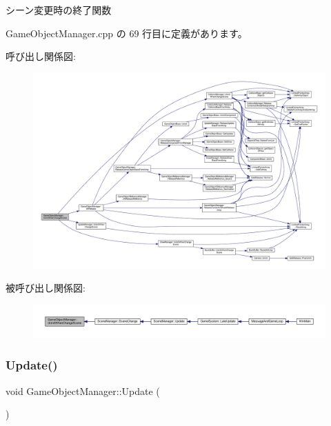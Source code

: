 シーン変更時の終了関数 



 Game\+Object\+Manager.\+cpp の 69 行目に定義があります。

呼び出し関係図\+:
\nopagebreak
\begin{figure}[H]
\begin{center}
\leavevmode
\includegraphics[width=350pt]{class_game_object_manager_ad962739b2c2f54d4160c3513132930da_cgraph}
\end{center}
\end{figure}
被呼び出し関係図\+:
\nopagebreak
\begin{figure}[H]
\begin{center}
\leavevmode
\includegraphics[width=350pt]{class_game_object_manager_ad962739b2c2f54d4160c3513132930da_icgraph}
\end{center}
\end{figure}
\mbox{\label{class_game_object_manager_a6f053b1c655de6ca1c9a8fa9b6e118ae}} 
\subsubsection{\texorpdfstring{Update()}{Update()}}
{\footnotesize\ttfamily void Game\+Object\+Manager\+::\+Update (\begin{DoxyParamCaption}{ }\end{DoxyParamCaption})\hspace{0.3cm}{\ttfamily [static]}}



